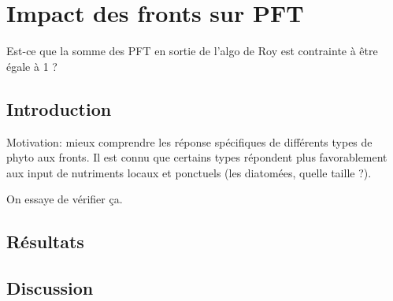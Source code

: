\documentclass[index]{subfiles}
\begin{document}
\chapter{Impact des fronts sur PFT}
\label{chp:res-pft}

Est-ce que la somme des PFT en sortie de l'algo de Roy est contrainte à être égale à 1 ?

\section{Introduction}

Motivation: mieux comprendre les réponse spécifiques de différents types de phyto aux fronts.
Il est connu que certains types répondent plus favorablement aux input de nutriments locaux et ponctuels (les diatomées, quelle taille ?).

On essaye de vérifier ça.

\section{Résultats}

\section{Discussion}

\biblio
\end{document}
